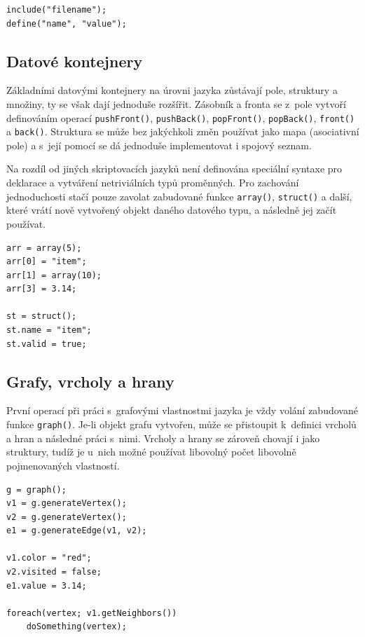 \documentclass[11pt,twoside,a4paper]{book}
\begin{document}
\begin{verbatim}
include("filename");
define("name", "value");
\end{verbatim}


\subsection{Datové kontejnery}

Základními datovými kontejnery na úrovni jazyka zůstávají pole, struktury a množiny, ty se však dají jednoduše rozšířit. Zásobník a fronta se z~pole vytvoří definováním operací \texttt{pushFront()}, \texttt{push\-Back()}, \texttt{popFront()}, \texttt{popBack()}, \texttt{front()} a \texttt{back()}. Struktura se může bez jakýchkoli změn po\-u\-ží\-vat jako mapa (asociativní pole) a s~její pomocí se dá jednoduše implementovat i spojový seznam.

Na rozdíl od jiných skriptovacích jazyků není definována speciální syntaxe pro deklarace a vytváření netriviálních typů proměnných. Pro zachování jednoduchosti stačí pouze zavolat zabudované funkce \texttt{array()}, \texttt{struct()} a další, které vrátí nově vytvořený objekt daného datového typu, a ná\-sled\-ně jej začít používat.

\begin{verbatim}
arr = array(5);
arr[0] = "item";
arr[1] = array(10);
arr[3] = 3.14;

st = struct();
st.name = "item";
st.valid = true;
\end{verbatim}


\subsection{Grafy, vrcholy a hrany}

První operací při práci s~grafovými vlastnostmi jazyka je vždy volání zabudované funkce \texttt{graph()}. Je-li objekt grafu vytvořen, může se přistoupit k~definici vrcholů a hran a následné práci s~nimi. Vrcholy a hrany se zároveň chovají i jako struktury, tudíž je u~nich možné používat libovolný počet libovolně pojmenovaných vlastností.

\begin{verbatim}
g = graph();
v1 = g.generateVertex();
v2 = g.generateVertex();
e1 = g.generateEdge(v1, v2);

v1.color = "red";
v2.visited = false;
e1.value = 3.14;

foreach(vertex; v1.getNeighbors())
    doSomething(vertex);
\end{verbatim}
\end{document}
